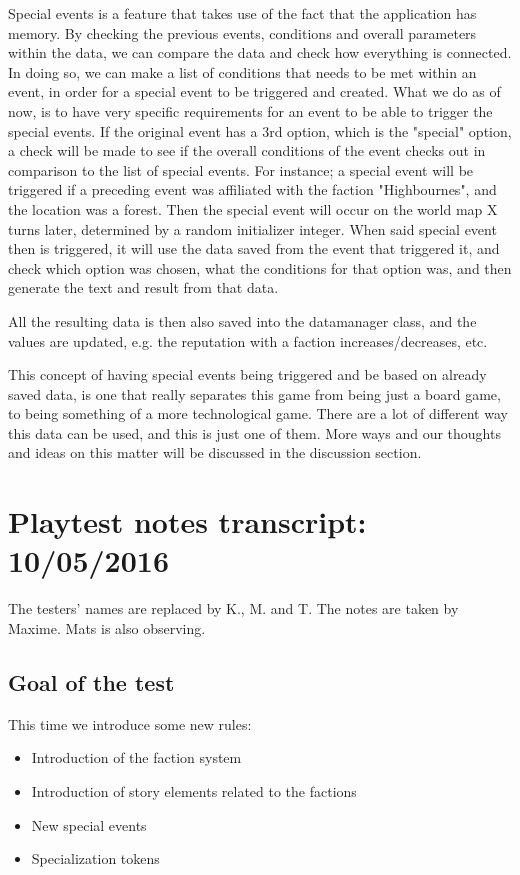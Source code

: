 \documentclass[a4paper,11pt]{report}
\begin{document}
Special events is a feature that takes use of the fact that the application has memory. By checking the previous events, conditions and overall parameters within the data, we can compare the data and check how everything is connected. In doing so, we can make a list of conditions that needs to be met within an event, in order for a special event to be triggered and created. What we do as of now, is to have very specific requirements for an event to be able to trigger the special events. If the original event has a 3rd option, which is the "special" option, a check will be made to see if the overall conditions of the event checks out in comparison to the list of special events.
For instance; a special event will be triggered if a preceding event was affiliated with the faction "Highbournes", and the location was a forest. Then the special event will occur on the world map X turns later, determined by a random initializer integer. When said special event then is triggered, it will use the data saved from the event that triggered it, and check which option was chosen, what the conditions for that option was, and then generate the text and result from that data.

All the resulting data is then also saved into the datamanager class, and the values are updated, e.g. the reputation with a faction increases/decreases, etc.


This concept of having special events being triggered and be based on already saved data, is one that really separates this game from being just a board game, to being something of a more technological game. There are a lot of different way this data can be used, and this is just one of them. More ways and our thoughts and ideas on this matter will be discussed in the discussion section.

\chapter{Playtest notes transcript: 10/05/2016}

The testers' names are replaced by K., M. and T. The notes are taken by Maxime. Mats is also observing.

\section{Goal of the test}
This time we introduce some new rules:
\begin{itemize}
\item Introduction of the faction system
\item Introduction of story elements related to the factions
\item New special events
\item Specialization tokens
\end{itemize}
\end{document}
